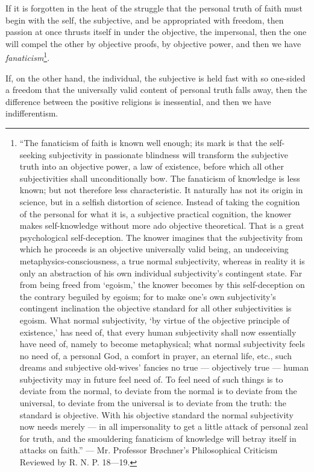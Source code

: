 \documentclass[12pt,a4paper,openany]{book}
\newcommand{\opage}[1]{\marginnote{\footnotesize\textit{[#1]}}}
\begin{document}
If it is forgotten in the heat of the struggle that the personal
truth of faith must begin with the self, the subjective, and
be appropriated with freedom, then passion at once thrusts itself
in under the objective, the impersonal, then
the one will compel the other by objective proofs,
by objective power, and then we have \emph{fanaticism}\footnote[1]{``The fanaticism of faith is known well enough; its mark is that the self-seeking subjectivity in passionate blindness will transform the subjective truth into an objective power, a law of existence, before which all other subjectivities shall unconditionally bow. The fanaticism of knowledge is less known; but not therefore less characteristic. It naturally has not its origin in science, but in a selfish distortion of science. Instead of taking the cognition of the personal for what it is, a subjective practical cognition, the knower makes self-knowledge without more ado objective theoretical. That is a great psychological self-deception. The knower imagines that the subjectivity from which he proceeds is an objective universally valid being, an undeceiving metaphysics-consciousness, a true normal subjectivity, whereas in reality it is only an abstraction of his own individual subjectivity's contingent state. Far from being freed from `egoism,' the knower becomes by this self-deception on the contrary beguiled by egoism; for to make one's own subjectivity's contingent inclination the objective standard for all other subjectivities is egoism. What normal subjectivity, `by virtue of the objective principle of existence,' has need of, that every human subjectivity shall now essentially have need of, namely to become metaphysical; what normal subjectivity feels no need of, a personal God, a comfort in prayer, an eternal life, etc., such dreams and subjective old-wives' fancies no true --- objectively true --- human subjectivity may in future feel need of. To feel need of such things is to deviate from the normal, to deviate from the normal is to deviate from the universal, to deviate from the universal is to deviate from the truth: the standard is objective. With his objective standard the normal subjectivity now needs merely --- in all impersonality to get a little attack of personal zeal for truth, and the smouldering fanaticism of knowledge will betray itself in attacks on faith.'' --- Mr. Professor Brøchner's Philosophical Criticism Reviewed by R. N. P. 18---19.}.

\setcounter{footnote}{0}%
\opage{604}If, on the other hand, the individual, the subjective is held fast
with so one-sided a freedom that the universally valid
content of personal truth falls away, then the difference between
the positive religions is inessential, and then we have indifferentism.
\end{document}
